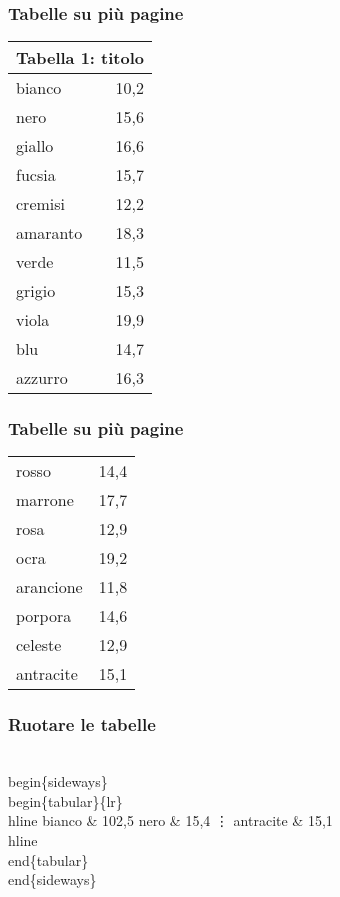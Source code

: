 \begin{frame}
  \frametitle{Tabelle su pi\`u pagine}
	\begin{LaTeXoutput}
		\begin{longtable}{lr}
		\multicolumn{2}{c}{Tabella 1: titolo}\\[1ex]\hline %
		bianco		& 10,2 \\
		nero		& 15,6 \\
		giallo		& 16,6 \\
		fucsia		& 15,7 \\
		cremisi		& 12,2 \\
		amaranto	& 18,3 \\
		verde		& 11,5 \\
		grigio		& 15,3 \\
		viola		& 19,9 \\
		blu		& 14,7 \\
		azzurro		& 16,3 
		\end{longtable}
	\end{LaTeXoutput}
\end{frame}
\begin{frame}
  \frametitle{Tabelle su pi\`u pagine}
	\begin{LaTeXoutput}
		\begin{longtable}{lr} %
		rosso		& 14,4 \\
		marrone		& 17,7 \\
		rosa		& 12,9 \\
		ocra		& 19,2 \\
		arancione	& 11,8 \\
		porpora		& 14,6 \\
		celeste		& 12,9 \\
		antracite	& 15,1 \\
		\hline
		\end{longtable}
	\end{LaTeXoutput}
\end{frame}
\begin{frame}
  \frametitle{Ruotare le tabelle}
	\begin{LaTeXcode}
		\alert{\\begin\{sideways\}}\n
		\\begin\{tabular\}\{lr\}\
		\\hline\n
		\hspace*{5ex}bianco    \& 102,5 \bs\bs\n
		\hspace*{5ex}nero      \& 15,4 \bs\bs\n
		\hspace*{10ex}\vdots\n
		\hspace*{5ex}antracite \& 15,1 \bs\bs\\hline\n
		\\end\{tabular\}\n
		\alert{\\end\{sideways\}}
	\end{LaTeXcode}
\end{frame}
